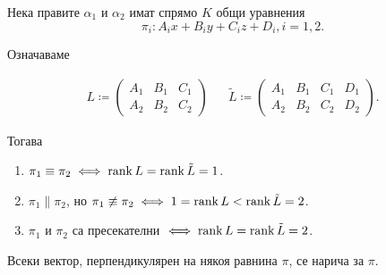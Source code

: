 \documentclass[numbers=endperiod, bibliography=totocnumbered]{scrartcl}
\begin{document}
\begin{theorem}
  Нека правите \( \alpha_1 \) и \( \alpha_2 \) имат спрямо \( K \) общи уравнения
  \begin{equation}
    \pi_i : A_i x + B_i y + C_i z + D_i, i = 1, 2.
  \end{equation}

  Означаваме

  \begin{align*}
    L \coloneqq \begin{pmatrix}
      A_1 & B_1 & C_1 \\
      A_2 & B_2 & C_2
    \end{pmatrix}
    &&
    \tilde L \coloneqq \begin{pmatrix}
      A_1 & B_1 & C_1 & D_1 \\
      A_2 & B_2 & C_2 & D_2
    \end{pmatrix}.
  \end{align*}

  Тогава
  \begin{enumerate}
    \item \( \pi_1 \equiv \pi_2 \iff \operatorname{rank} L = \operatorname{rank} \tilde L = 1 \).
    \item \( \pi_1 \parallel \pi_2 \), но \( \pi_1 \not\equiv \pi_2 \iff 1 = \operatorname{rank} L < \operatorname{rank} \tilde L = 2 \).
    \item \( \pi_1 \) и \( \pi_2 \) са пресекателни \( \iff \operatorname{rank} L = \operatorname{rank} \tilde L = 2 \).
  \end{enumerate}
\end{theorem}

\begin{definition}
  Всеки вектор, перпендикулярен на някоя равнина \( \pi \), се нарича  за \( \pi \).
\end{definition}
\end{document}
